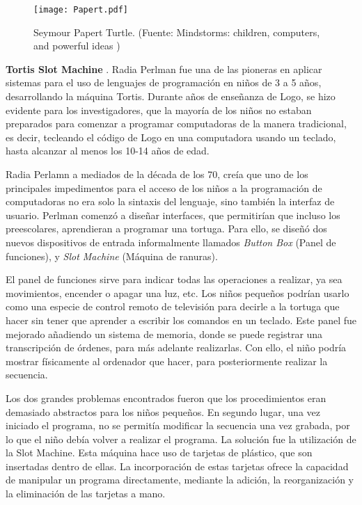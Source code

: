 \begin{figure}[!h]
\begin{center}
\texttt{[image: Papert.pdf]}
\caption{Seymour Papert Turtle. (Fuente: Mindstorms: children, computers, and powerful ideas \cite{Papert})}
\label{fig:Papert}
\end{center}
\end{figure}

\textbf{Tortis Slot Machine} \cite{Perlman}. 
Radia Perlman fue una de las pioneras en aplicar sistemas para el uso de lenguajes de programación en niños de 3 a 5 años, desarrollando la máquina Tortis. Durante años de enseñanza de Logo, se hizo evidente para los investigadores, que la mayoría de los niños no estaban preparados para comenzar a programar computadoras de la manera tradicional, es decir, tecleando el código de Logo en una computadora usando un teclado, hasta alcanzar al menos los 10-14 años de edad. 

Radia Perlamn a mediados de la década de los 70, creía que uno de los principales impedimentos para el acceso de los niños a la programación de computadoras no era solo la sintaxis del lenguaje, sino también la interfaz de usuario. Perlman comenzó a diseñar interfaces, que permitirían que incluso los preescolares, aprendieran a programar una tortuga. Para ello, se diseñó dos nuevos dispositivos de entrada informalmente llamados \textit{Button Box} (Panel de funciones), y \textit{Slot Machine} (Máquina de ranuras). 

El panel de funciones sirve para indicar todas las operaciones a realizar, ya sea movimientos, encender o apagar una luz, etc. Los niños pequeños podrían usarlo como una especie de control remoto de televisión para decirle a la tortuga que hacer sin tener que aprender a escribir los comandos en un teclado. Este panel fue mejorado añadiendo un sistema de memoria, donde se puede registrar una transcripción de órdenes, para más adelante realizarlas. Con ello, el niño podría mostrar físicamente al ordenador que hacer, para posteriormente realizar la secuencia.

Los dos grandes problemas encontrados fueron que los procedimientos eran demasiado abstractos para los niños pequeños. En segundo lugar, una vez iniciado el programa, no se permitía modificar la secuencia una vez grabada, por lo que el niño debía volver a realizar el programa. La solución fue la utilización de la Slot Machine. Esta máquina hace uso de tarjetas de plástico, que son insertadas dentro de ellas. La incorporación de estas tarjetas ofrece la capacidad de manipular un programa directamente, mediante la adición, la reorganización y la eliminación de las tarjetas a mano.

